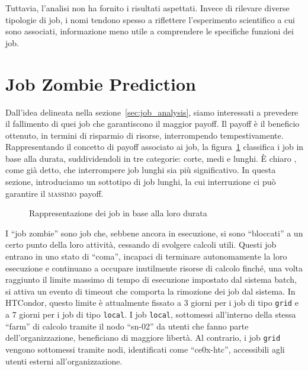 Tuttavia, l'analisi non ha fornito i risultati aspettati. Invece di rilevare
diverse tipologie di job, i nomi tendono spesso a riflettere l'esperimento
scientifico a cui sono associati, informazione meno utile a comprendere le
specifiche funzioni dei job.

\section{Job Zombie Prediction}

Dall'idea delineata nella sezione~\ref{sec:job_analysis}, siamo interessati a
prevedere il fallimento di quei job che garantiscono il maggior payoff. Il
payoff è il beneficio ottenuto, in termini di risparmio di risorse,
interrompendo tempestivamente. Rappresentando il concetto di payoff associato
ai job, la figura~\ref{fig:job_payoff} classifica i job in base alla durata, suddividendoli
in tre categorie: corte, medi e lunghi. È chiaro , come già detto, che
interrompere job lunghi sia più significativo. In questa sezione, introduciamo
un sottotipo di job lunghi, la cui interruzione ci può garantire il
\textsc{massimo} payoff.

\begin{figure}[!ht]
    \centering
    \caption{Rappresentazione dei job in base alla loro durata}
    \label{fig:job_payoff}
\end{figure}

I ``job zombie'' sono job che, sebbene ancora in esecuzione, si sono
``bloccati'' a un certo punto della loro attività, cessando di svolgere
calcoli utili. Questi job entrano in uno stato di ``coma'', incapaci di
terminare autonomamente la loro esecuzione e continuano a occupare inutilmente
risorse di calcolo finché, una volta raggiunto il limite massimo di tempo di
esecuzione impostato dal sistema batch, si attiva un evento di timeout che
comporta la rimozione dei job dal sistema. In HTCondor, questo limite è
attualmente fissato a 3 giorni per i job di tipo \texttt{grid} e a 7 giorni
per i job di tipo \texttt{local}.
I job \texttt{local}, sottomessi all'interno della stessa ``farm'' di calcolo
tramite il nodo ``sn-02'' da utenti che fanno parte dell'organizzazione,
beneficiano di maggiore libertà. Al contrario, i job \texttt{grid} vengono
sottomessi tramite nodi, identificati come ``ce0x-htc'', accessibili agli
utenti esterni all'organizzazione.

